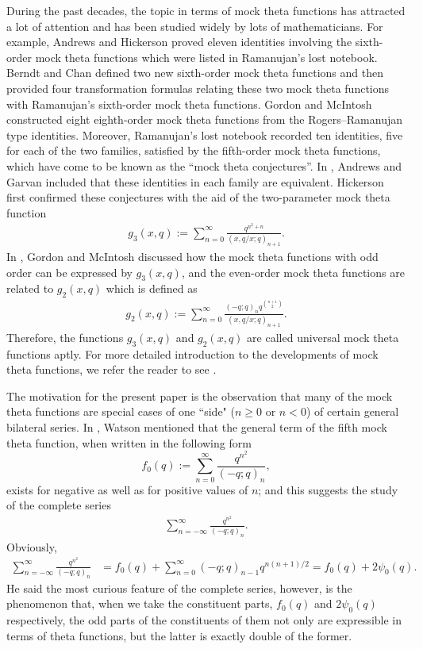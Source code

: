 \documentclass[pdftex]{sigma}
\numberwithin{equation}{section}
\begin{document}
During the past decades, the topic in terms of mock theta functions has attracted a lot of attention and has been studied widely by lots of mathematicians. For example, Andrews and Hickerson \cite{AH} proved eleven identities involving the sixth-order mock
theta functions which were listed in Ramanujan's lost notebook. Berndt and Chan
 \cite{BC} defined two new sixth-order mock theta functions and then provided four transformation formulas relating these two mock theta functions with Ramanujan's sixth-order mock theta functions. Gordon and McIntosh~\cite{GM2} constructed eight eighth-order mock theta
functions from the Rogers--Ramanujan type identities. Moreover, Ramanujan's lost notebook \cite{R} recorded ten identities, five for each of the two families, satisfied by the fifth-order mock theta functions, which have come to be known as the ``mock theta conjectures''. In \cite{AG}, Andrews and Garvan included that these identities in each family are equivalent.
Hickerson \cite{H} first confirmed these conjectures with the aid of the two-parameter mock theta function
\begin{align}\label{g3}
g_3(x,q):=\sum_{n=0}^{\infty}\frac{q^{n^2+n}}{(x,q/x;q)_{n+1}}.
\end{align}
In \cite{GM}, Gordon and McIntosh discussed how the mock theta functions with odd order can be expressed by $g_3(x,q)$,
and the even-order mock theta functions are related to $g_2(x,q)$ which is defined as
\begin{align*}
g_2(x,q):=\sum_{n=0}^{\infty}\frac{(-q;q)_nq^{n+1\choose2}}
{(x,q/x;q)_{n+1}}.
\end{align*}
Therefore, the functions $g_3(x,q)$ and $g_2(x,q)$ are called universal mock theta functions aptly. For more detailed introduction to the developments of mock theta functions, we refer the reader to see \cite{GM}.


The motivation for the present paper is the observation that
many of the mock theta functions are special cases of one ``side" ($n \geq 0$ or $n < 0$)
of certain general bilateral series. In \cite{W2}, Watson mentioned that the general term of the fifth mock theta function, when written in the following form
\[
f_{0}(q):=\sum_{n=0}^{\infty}\frac{q^{n^2}}{(-q;q)_n},
\]
exists for negative as well as for positive values of $n$; and this suggests the study of the complete series
\begin{align}\label{bf}
\sum_{n=-\infty}^{\infty}\frac{q^{n^2}}{(-q;q)_n}.
\end{align}
Obviously,
\begin{align*}
\sum_{n=-\infty}^{\infty}\frac{q^{n^2}}{(-q;q)_n}&=f_0(q)+\sum_{n=0}^{\infty}(-q;q)_{n-1}q^{n(n+1)/2}=f_0(q)+2\psi_{0}(q).
\end{align*}
He said the most curious feature of the complete series, however, is the phenomenon that, when we take the constituent parts, $f_{0}(q)$ and $2\psi_{0}(q)$ respectively, the odd parts of the constituents of them
 not only are expressible in terms of theta functions, but the latter is exactly double of the former.
\end{document}
